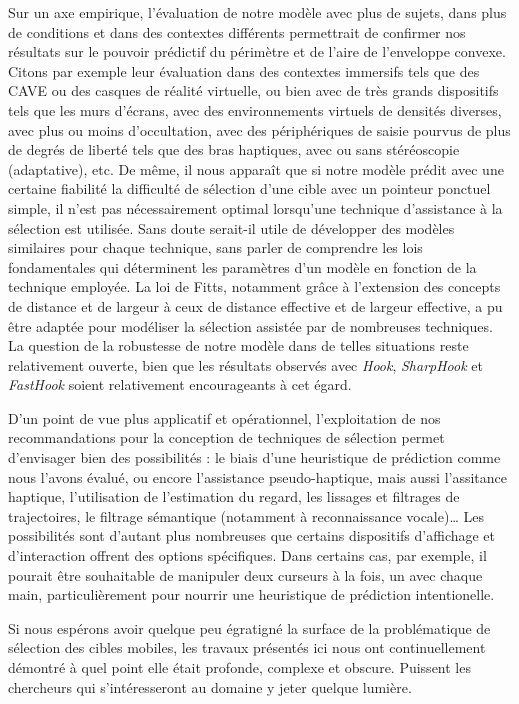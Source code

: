 	Sur un axe empirique, l'évaluation de notre modèle avec plus de sujets, dans plus de conditions et dans des contextes différents permettrait de confirmer nos résultats sur le pouvoir prédictif du périmètre et de l'aire de l'enveloppe convexe. Citons par exemple leur évaluation dans des contextes immersifs tels que des CAVE ou des casques de réalité virtuelle, ou bien avec de très grands dispositifs tels que les murs d'écrans, avec des environnements virtuels de densités diverses, avec plus ou moins d'occultation, avec des périphériques de saisie pourvus de plus de degrés de liberté tels que des bras haptiques, avec ou sans stéréoscopie (adaptative), etc. De même, il nous apparaît que si notre modèle prédit avec une certaine fiabilité la difficulté de sélection d'une cible avec un pointeur ponctuel simple, il n'est pas nécessairement optimal lorsqu'une technique d'assistance à la sélection est utilisée. Sans doute serait-il utile de développer des modèles similaires pour chaque technique, sans parler de comprendre les lois fondamentales qui déterminent les paramètres d'un modèle en fonction de la technique employée. La loi de Fitts, notamment grâce à l'extension des concepts de distance et de largeur à ceux de distance effective et de largeur effective, a pu être adaptée pour modéliser la sélection assistée par de nombreuses techniques. La question de la robustesse de notre modèle dans de telles situations reste relativement ouverte, bien que les résultats observés avec \emph{Hook}, \emph{SharpHook} et \emph{FastHook} soient relativement encourageants à cet égard.
	
	D'un point de vue plus applicatif et opérationnel, l'exploitation de nos recommandations pour la conception de techniques de sélection permet d'envisager bien des possibilités : le biais d'une heuristique de prédiction comme nous l'avons évalué, ou encore l'assistance pseudo-haptique, mais aussi l'assitance haptique, l'utilisation de l'estimation du regard, les lissages et filtrages de trajectoires, le filtrage sémantique (notamment à reconnaissance vocale)\ldots{} Les possibilités sont d'autant plus nombreuses que certains dispositifs d'affichage et d'interaction offrent des options spécifiques. Dans certains cas, par exemple, il pourait être souhaitable de manipuler deux curseurs à la fois, un avec chaque main, particulièrement pour nourrir une heuristique de prédiction intentionelle.
	
	Si nous espérons avoir quelque peu égratigné la surface de la problématique de sélection des cibles mobiles, les travaux présentés ici nous ont continuellement démontré à quel point elle était profonde, complexe et obscure. Puissent les chercheurs qui s'intéresseront au domaine y jeter quelque lumière.